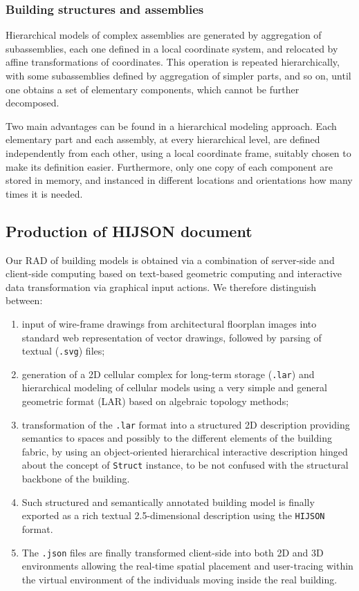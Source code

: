 \documentclass[]{egpubl}
\begin{document}
\subsubsection*{Building structures and assemblies}

Hierarchical models of complex assemblies are generated by aggregation
of subassemblies, each one defined in a local coordinate system, and
relocated by affine transformations of coordinates.  This operation
is repeated hierarchically, with some subassemblies defined by
aggregation of simpler parts, and so on, until one obtains a set of
elementary components, which cannot be further decomposed.

Two main advantages can be found in a hierarchical modeling approach. Each elementary part and each assembly, at every hierarchical level, are defined independently from each other, using a local coordinate frame, suitably chosen to make its definition easier. Furthermore, only one copy of each component are stored in memory, and instanced in different locations and orientations how many times it is needed.


\subsection{Production of HIJSON document}

Our RAD of building models is 
obtained via a combination of server-side and client-side computing
based on text-based geometric computing and interactive data 
transformation via graphical input actions. We therefore distinguish
between:

\begin{enumerate}
\def\labelenumi{(\alph{enumi})}
\item
  input of wire-frame drawings from architectural floorplan images into
  standard web representation of vector drawings, followed by parsing of textual (\texttt{.svg}) files;
\item
  generation of a 2D cellular complex for long-term storage
  (\texttt{.lar}) and hierarchical modeling of cellular models using a very simple and general geometric format (LAR) based on algebraic topology methods;
\item
  transformation of the \texttt{.lar} format into a structured 2D
  description providing semantics to spaces and possibly to the
  different elements of the building fabric, by using an object-oriented
  hierarchical interactive description hinged about the concept of
  \texttt{Struct} instance, to be not confused with the structural
  backbone of the building. 
\item
Such structured and semantically annotated
  building model is finally
  exported as a rich textual 2.5-dimensional description using the
  \texttt{HIJSON} format. 
\item
  The \texttt{.json} files are finally transformed client-side into both
  2D and 3D environments allowing the real-time spatial placement and
  user-tracing within the virtual environment of the individuals moving
  inside the real building.
\end{enumerate}
\end{document}
